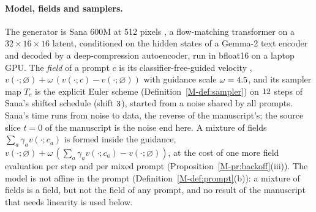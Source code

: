 \documentclass{article}
\newcommand{\mref}[1]{\ref{M-#1}}        %
\begin{document}
\paragraph{Model, fields and samplers.}
The generator is Sana 600M at 512 pixels \citep{xie2025sana}, a flow-matching transformer on a $32\times16\times16$ latent,
conditioned on the hidden states of a Gemma-2 text encoder and decoded by a deep-compression autoencoder, run in bfloat16 on a laptop
GPU. The \emph{field} of a prompt $c$ is its classifier-free-guided velocity \citep{ho2022classifier},
$v(\cdot;\varnothing)+\omega\,(v(\cdot;c)-v(\cdot;\varnothing))$ with guidance scale $\omega=4.5$, and its sampler map $T_c$
is the explicit Euler scheme (Definition~\mref{def:sampler}) on $12$ steps of Sana's shifted schedule (shift $3$),
started from a noise shared by all prompts. Sana's time runs from noise to data, the reverse of the manuscript's; the source
slice $t=0$ of the manuscript is the noise end here. A mixture of fields $\sum_a\gamma_a v(\cdot;c_a)$ is formed inside the
guidance, $v(\cdot;\varnothing)+\omega\,(\sum_a\gamma_av(\cdot;c_a)-v(\cdot;\varnothing))$, at the cost of one more field
evaluation per step and per mixed prompt (Proposition~\mref{pr:backoff}(iii)). The model is not affine in the prompt
(Definition~\mref{def:prompt}(b)): a mixture of fields is a field, but not the field of any prompt, and no result of the
manuscript that needs linearity is used below.
\end{document}
